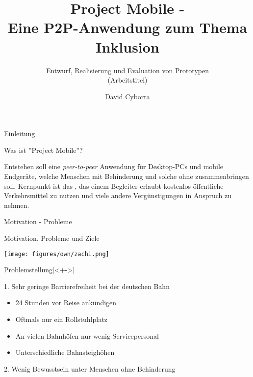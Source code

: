 


\title{Project Mobile - \\Eine P2P-Anwendung zum Thema Inklusion}
\subtitle{Entwurf, Realisierung und Evaluation von Prototypen\\(Arbeitstitel)}
\author[David Cyborra]{David Cyborra} 

\titlepage




\begin{subsection}{Einleitung}


\begin{frame}{Was ist ''Project Mobile''?}
\begin{definition}
	Entstehen soll eine \textit{peer-to-peer} Anwendung für Desktop-PCs und mobile Endgeräte, welche Menschen mit Behinderung und solche ohne zusammenbringen soll. Kernpunkt ist das , das einem Begleiter erlaubt kostenlos öffentliche Verkehrsmittel zu nutzen und viele andere Vergünstigungen in Anspruch zu nehmen.\\
\end{definition}
\pause
{}
\end{frame}


\end{subsection}




\begin{subsection}{Motivation - Probleme}
\begin{frame}{Motivation, Probleme und Ziele}

\begin{2columns}[0.35] %
{\centering\texttt{[image: figures/own/zachi.png]}}
{ 


\pause
\begin{titleditems}{Problemstellung}[<+->]
\pause
	\item[1.]Sehr geringe Barrierefreiheit bei der deutschen Bahn \cite{wittmann}
	\pause
	\begin{itemize}
	  \item 24 Stunden vor Reise ankündigen
	  \item Oftmals nur ein Rollstuhlplatz
	  \item An vielen Bahnhöfen nur wenig Servicepersonal
	  \item Unterschiedliche Bahnsteighöhen
	\end{itemize} 
	\item[2.]Wenig Bewusstsein unter Menschen ohne Behinderung \cite{wittmann}
\end{titleditems}
\pause

}
\end{2columns}

\end{frame}
\end{subsection} %



